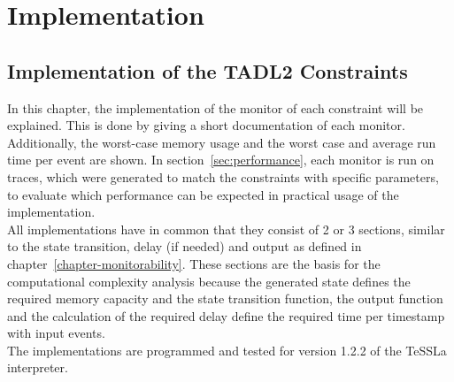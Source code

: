
\chapter{Implementation}
\label{chapter-implementation}
	\section{Implementation of the TADL2 Constraints}
	In this chapter, the implementation of the monitor of each constraint will be explained. This is done by giving a short documentation of each monitor. Additionally, the worst-case memory usage and the worst case and average run time per event are shown. In section~\ref{sec:performance}, each monitor is run on traces, which were generated to match the constraints with specific parameters, to evaluate which performance can be expected in practical usage of the implementation.\\
	All implementations have in common that they consist of 2 or 3 sections, similar to the state transition, delay (if needed) and output as defined in chapter~\ref{chapter-monitorability}. These sections are the basis for the computational complexity analysis because the generated state defines the required memory capacity and the state transition function, the output function and the calculation of the required delay define the required time per timestamp with input events.\\
	The implementations are programmed and tested for version 1.2.2 of the TeSSLa interpreter.
